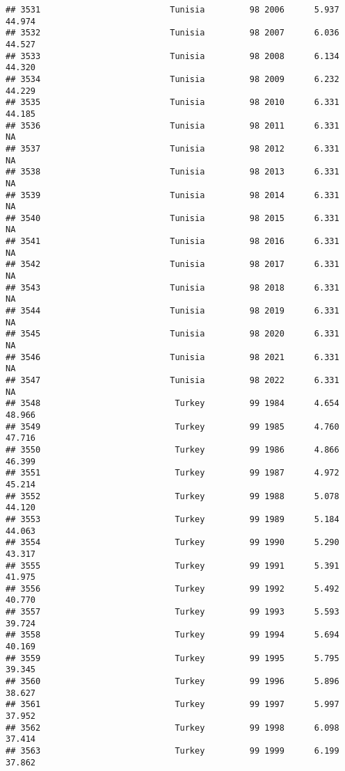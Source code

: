 \documentclass[
]{article}
\begin{document}
\begin{verbatim}
## 3531                          Tunisia         98 2006      5.937     44.974
## 3532                          Tunisia         98 2007      6.036     44.527
## 3533                          Tunisia         98 2008      6.134     44.320
## 3534                          Tunisia         98 2009      6.232     44.229
## 3535                          Tunisia         98 2010      6.331     44.185
## 3536                          Tunisia         98 2011      6.331         NA
## 3537                          Tunisia         98 2012      6.331         NA
## 3538                          Tunisia         98 2013      6.331         NA
## 3539                          Tunisia         98 2014      6.331         NA
## 3540                          Tunisia         98 2015      6.331         NA
## 3541                          Tunisia         98 2016      6.331         NA
## 3542                          Tunisia         98 2017      6.331         NA
## 3543                          Tunisia         98 2018      6.331         NA
## 3544                          Tunisia         98 2019      6.331         NA
## 3545                          Tunisia         98 2020      6.331         NA
## 3546                          Tunisia         98 2021      6.331         NA
## 3547                          Tunisia         98 2022      6.331         NA
## 3548                           Turkey         99 1984      4.654     48.966
## 3549                           Turkey         99 1985      4.760     47.716
## 3550                           Turkey         99 1986      4.866     46.399
## 3551                           Turkey         99 1987      4.972     45.214
## 3552                           Turkey         99 1988      5.078     44.120
## 3553                           Turkey         99 1989      5.184     44.063
## 3554                           Turkey         99 1990      5.290     43.317
## 3555                           Turkey         99 1991      5.391     41.975
## 3556                           Turkey         99 1992      5.492     40.770
## 3557                           Turkey         99 1993      5.593     39.724
## 3558                           Turkey         99 1994      5.694     40.169
## 3559                           Turkey         99 1995      5.795     39.345
## 3560                           Turkey         99 1996      5.896     38.627
## 3561                           Turkey         99 1997      5.997     37.952
## 3562                           Turkey         99 1998      6.098     37.414
## 3563                           Turkey         99 1999      6.199     37.862

\end{verbatim}
\end{document}
